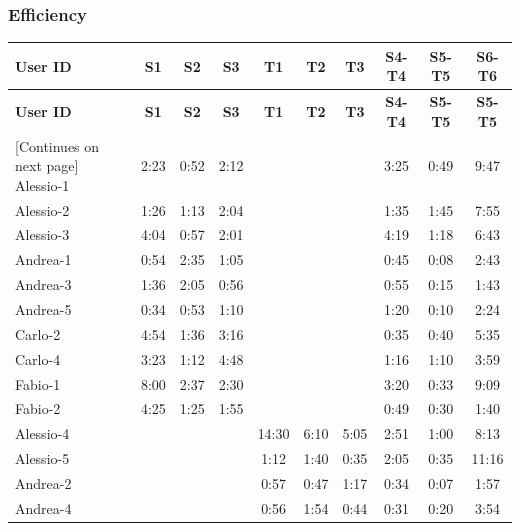 \subsubsection{Efficiency}
    \begin{tabularx}{\linewidth}{l|c|c|c|c|c|c|c|c|c}
    \toprule
    \textbf{User ID} & \textbf{S1} & \textbf{S2} & \textbf{S3} & \textbf{T1} & \textbf{T2} & \textbf{T3} & \textbf{S4-T4} & \textbf{S5-T5} & \textbf{S6-T6} \\
    \midrule
    \endfirsthead
    \toprule
    \textbf{User ID} & \textbf{S1} & \textbf{S2} & \textbf{S3} & \textbf{T1} & \textbf{T2} & \textbf{T3} & \textbf{S4-T4} & \textbf{S5-T5} & \textbf{S5-T5} \\
    \midrule
    \endhead
    \midrule
    \footnotesize [Continues on next page]
    \endfoot
    \bottomrule
    \endlastfoot
        Alessio-1 & 2:23 & 0:52 & 2:12 &  &  &  & 3:25 & 0:49 & 9:47 \\ \midrule
        Alessio-2 & 1:26 & 1:13 & 2:04 &  &  &  & 1:35 & 1:45 & 7:55 \\ \midrule
        Alessio-3 & 4:04 & 0:57 & 2:01 &  &  &  & 4:19 & 1:18 & 6:43 \\ \midrule
        Andrea-1 & 0:54 & 2:35 & 1:05 &  &  &  & 0:45 & 0:08 & 2:43 \\ \midrule
        Andrea-3 & 1:36 & 2:05 & 0:56 &  &  &  & 0:55 & 0:15 & 1:43 \\ \midrule
        Andrea-5 & 0:34 & 0:53 & 1:10 &  &  &  & 1:20 & 0:10 & 2:24 \\ \midrule
        Carlo-2 & 4:54 & 1:36 & 3:16 &  &  &  & 0:35 & 0:40 & 5:35 \\ \midrule
        Carlo-4 & 3:23 & 1:12 & 4:48 &  &  &  & 1:16 & 1:10 & 3:59 \\ \midrule
        Fabio-1 & 8:00 & 2:37 & 2:30 &  &  &  & 3:20 & 0:33 & 9:09 \\ \midrule
        Fabio-2 & 4:25 & 1:25 & 1:55 &  &  &  & 0:49 & 0:30 & 1:40 \\ \midrule
        Alessio-4 &  &  &  & 14:30 & 6:10 & 5:05 & 2:51 & 1:00 & 8:13 \\ \midrule
        Alessio-5 &  &  &  & 1:12 & 1:40 & 0:35 & 2:05 & 0:35 & 11:16 \\ \midrule
        Andrea-2 &  &  &  & 0:57 & 0:47 & 1:17 & 0:34 & 0:07 & 1:57 \\ \midrule
        Andrea-4 &  &  &  & 0:56 & 1:54 & 0:44 & 0:31 & 0:20 & 3:54 \\ \midrule

\end{tabularx}
